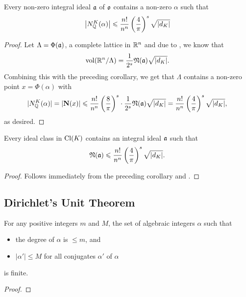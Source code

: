 \begin{corollary}
    Every non-zero integral ideal $\mathfrak{a}$ of $\mathfrak{o}$ contains a non-zero $\alpha$ such that 
    \begin{equation*}
        \left|N^K_{\mathbb{Q}}(\alpha)\right|\leqslant\frac{n!}{n^n}\left(\frac{4}{\pi}\right)^s\sqrt{|d_K|}
    \end{equation*}
\end{corollary}
\begin{proof}
    Let $\Lambda = \Phi(\mathfrak{a})$, a complete lattice in $\mathbb{R}^n$ and due to , we know that 
    \begin{equation*}
        \operatorname{vol}(\mathbb{R}^n/\Lambda) = \frac{1}{2^s}\mathfrak{N}(\mathfrak{a})\sqrt{|d_K|}.
    \end{equation*}
    Combining this with the preceding corollary, we get that $\Lambda$ contains a non-zero point $x = \Phi(\alpha)$ with 
    \begin{equation*}
        |N^K_{\mathbb{Q}}(\alpha)| = |\mathbf N(x)|\leqslant\frac{n!}{n^n}\left(\frac{8}{\pi}\right)^s\cdot\frac{1}{2^s}\mathfrak{N}(\mathfrak{a})\sqrt{|d_K|} = \frac{n!}{n^n}\left(\frac{4}{\pi}\right)^s\sqrt{|d_K|},
    \end{equation*}
    as desired.
\end{proof}

\begin{corollary}
    Every ideal class in $\operatorname{Cl}(K)$ contains an integral ideal $\mathfrak{a}$ such that 
    \begin{equation*}
        \mathfrak{N}(\mathfrak{a})\leqslant\frac{n!}{n^n}\left(\frac{4}{\pi}\right)^s\sqrt{|d_K|}.
    \end{equation*}
\end{corollary}
\begin{proof}
    Follows immediately from the preceding corollary and .
\end{proof}

\subsection{Dirichlet's Unit Theorem}

\begin{lemma}
    For any positive integers $m$ and $M$, the set of algebraic integers $\alpha$ such that 
    \begin{itemize}
        \item the degree of $\alpha$ is $\le m$, and 
        \item $|\alpha'|\le M$ for all conjugates $\alpha'$ of $\alpha$
    \end{itemize}
    is finite.
\end{lemma}
\begin{proof}
    
\end{proof}